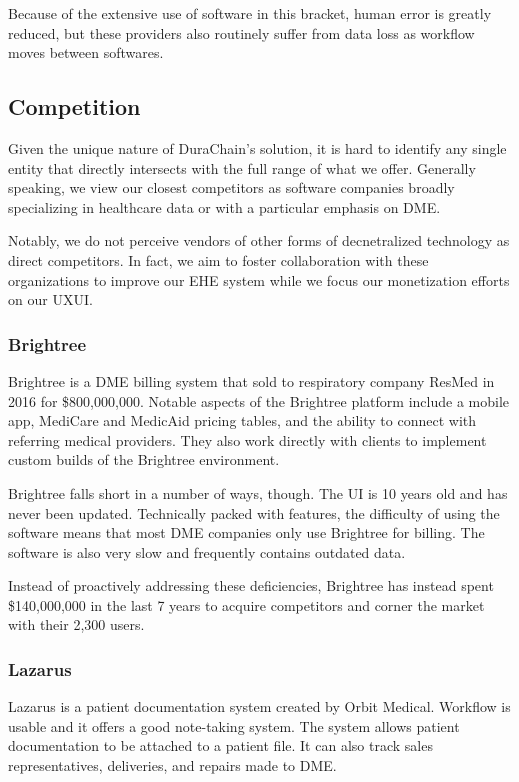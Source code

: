 \documentclass[letterpaper]{article}
\begin{document}
  Because of the extensive use of software in this bracket, human error is greatly reduced, but these providers also routinely suffer from data loss as workflow moves between softwares.%

\subsection{Competition}
Given the unique nature of DuraChain's solution, it is hard to identify any single entity that directly intersects with the full range of what we offer. Generally speaking, we view our closest competitors as software companies broadly specializing in healthcare data or with a particular emphasis on DME.%

Notably, we do not perceive vendors of other forms of decnetralized technology as direct competitors. In fact, we aim to foster collaboration with these organizations to improve our EHE system while we focus our monetization efforts on our UXUI.%

  \subsubsection{Brightree}
  Brightree is a DME billing system that sold to respiratory company ResMed in 2016 for \$800,000,000. Notable aspects of the Brightree platform include a mobile app, MediCare and MedicAid pricing tables, and the ability to connect with referring medical providers. They also work directly with clients to implement custom builds of the Brightree environment.%

  Brightree falls short in a number of ways, though. The UI is 10 years old and has never been updated. Technically packed with features, the difficulty of using the software means that most DME companies only use Brightree for billing. The software is also very slow and frequently contains outdated data.%

  Instead of proactively addressing these deficiencies, Brightree has instead spent \$140,000,000 in the last 7 years to acquire competitors and corner the market with their 2,300 users.%

  \subsubsection{Lazarus}
  Lazarus is a patient documentation system created by Orbit Medical. Workflow is usable and it offers a good note-taking system. The system allows patient documentation to be attached to a patient file. It can also track sales representatives, deliveries, and repairs made to DME.%
\end{document}

